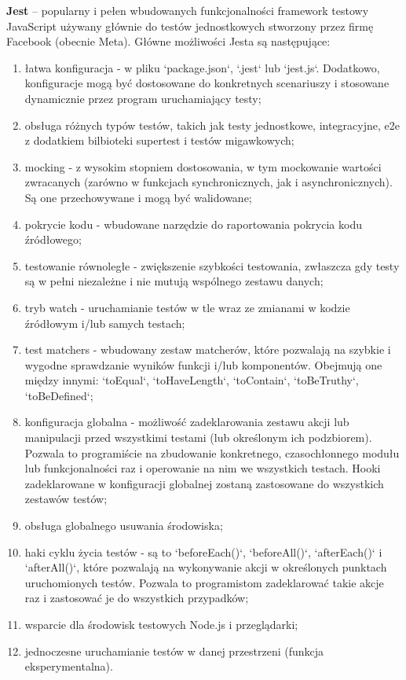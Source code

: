 \documentclass[12pt, a4paper, twoside, openany]{book}
\begin{document}
\textbf{Jest} -- popularny i pełen wbudowanych funkcjonalności framework testowy JavaScript używany głównie do testów jednostkowych stworzony przez firmę Facebook (obecnie Meta). Główne możliwości Jesta są następujące:
\begin{enumerate}[label=--]
    \item łatwa konfiguracja - w pliku `package.json`, `.jest` lub `jest.js`. Dodatkowo, konfiguracje mogą być dostosowane do konkretnych scenariuszy i stosowane dynamicznie przez program uruchamiający testy;
    \item obsługa różnych typów testów, takich jak testy jednostkowe, integracyjne, e2e z dodatkiem bilbioteki supertest i testów migawkowych;
    \item mocking - z wysokim stopniem dostosowania, w tym mockowanie wartości zwracanych (zarówno w funkcjach synchronicznych, jak i asynchronicznych). Są one przechowywane i mogą być walidowane;
    \item pokrycie kodu - wbudowane narzędzie do raportowania pokrycia kodu źródłowego;
    \item testowanie równoległe - zwiększenie szybkości testowania, zwłaszcza gdy testy są w pełni niezależne i nie mutują wspólnego zestawu danych;
    \item tryb watch - uruchamianie testów w tle wraz ze zmianami w kodzie źródłowym i/lub samych testach;
    \item test matchers - wbudowany zestaw matcherów, które pozwalają na szybkie i wygodne sprawdzanie wyników funkcji i/lub komponentów. Obejmują one między innymi: `toEqual`, `toHaveLength`, `toContain`, `toBeTruthy`, `toBeDefined`;
    \item konfiguracja globalna - możliwość zadeklarowania zestawu akcji lub manipulacji przed wszystkimi testami (lub określonym ich podzbiorem). Pozwala to programiście na zbudowanie konkretnego, czasochłonnego modułu lub funkcjonalności raz i operowanie na nim we wszystkich testach. Hooki zadeklarowane w konfiguracji globalnej zostaną zastosowane do wszystkich zestawów testów;
    \item obsługa globalnego usuwania środowiska;
    \item haki cyklu życia testów - są to `beforeEach()`, `beforeAll()`, `afterEach()` i `afterAll()`, które pozwalają na wykonywanie akcji w określonych punktach uruchomionych testów. Pozwala to programistom zadeklarować takie akcje raz i zastosować je do wszystkich przypadków;
    \item wsparcie dla środowisk testowych Node.js i przeglądarki;
    \item jednoczesne uruchamianie testów w danej przestrzeni (funkcja eksperymentalna).
\end{enumerate}
\end{document}
